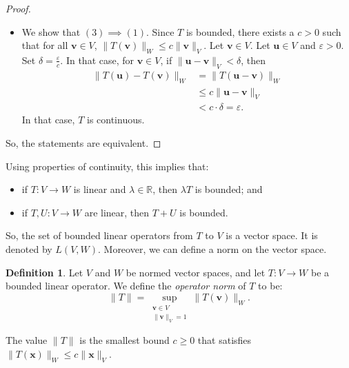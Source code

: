\documentclass[a4paper, openany]{memoir}
\theoremstyle{definition}
\newtheorem{definition}{Definition}[section]
\theoremstyle{plain}
\begin{document}
\begin{proof}
\begin{itemize}
            \item We show that $(3) \implies (1)$. Since $T$ is bounded, there exists a $c > 0$ such that for all $\bm{v} \in V$, $\lVert T(\bm{v}) \rVert_W \leq c \lVert \bm{v} \rVert_V$. Let $\bm{v} \in V$. Let $\bm{u} \in V$ and $\varepsilon > 0$. Set $\delta = \frac{\varepsilon}{c}$. In that case, for $\bm{v} \in V$, if $\lVert \bm{u} - \bm{v} \rVert_V < \delta$, then
            \begin{align*}
                \lVert T(\bm{u}) - T(\bm{v}) \rVert_W &= \lVert T(\bm{u} - \bm{v}) \rVert_W \\
                &\leq c \lVert \bm{u} - \bm{v} \rVert_V \\
                &< c \cdot \delta = \varepsilon.
            \end{align*}
            In that case, $T$ is continuous.
        \end{itemize}
        So, the statements are equivalent.
    \end{proof}
    Using properties of continuity, this implies that:
    \begin{itemize}
        \item if $T: V \to W$ is linear and $\lambda \in \mathbb{R}$, then $\lambda T$ is bounded; and
        \item if $T, U: V \to W$ are linear, then $T + U$ is bounded.
    \end{itemize}
    So, the set of bounded linear operators from $T$ to $V$ is a vector space. It is denoted by $L(V, W)$. Moreover, we can define a norm on the vector space.
    \begin{definition}
        Let $V$ and $W$ be normed vector spaces, and let $T: V \to W$ be a bounded linear operator. We define the \emph{operator norm} of $T$ to be:
        \[\lVert T \rVert = \sup_{\substack{\bm{v} \in V \\ \lVert \bm{v} \rVert_V = 1}} \lVert T(\bm{v}) \rVert_W.\]
    \end{definition}
    \noindent The value $\lVert T \rVert$ is the smallest bound $c \geq 0$ that satisfies $\lVert T(\bm{x}) \rVert_W \leq c \lVert \bm{x} \rVert_V$.
\end{document}
